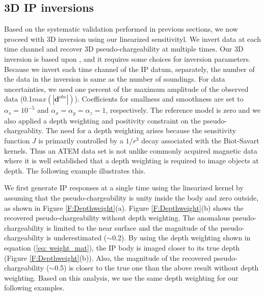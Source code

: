 \documentclass[a4paper, 11pt]{article}
\begin{document}
\subsection{3D IP inversions}
Based on the systematic validation performed in previous sections, we now proceed with 3D  inversion using our linearized sensitivityl.
We invert data at each  time channel and recover 3D pseudo-chargeability at multiple times. 
Our 3D inversion is based upon \cite{doug1994,Li2000}, and it requires some choices for inversion parameters. 
Because we invert each time channel of the IP datum, separately, the number of the data in the inversion is same as the number of soundings. 
For data uncertainties, we used one percent of the maximum amplitude of the observed data (0.1$max(|\mathbf{d}^{obs}|)$). Coefficients for smallness and smoothness are set to $\alpha_s=10^{-5}$ and $\alpha_x=\alpha_y=\alpha_z=1$, respectively. The reference model is zero and we also applied a depth weighting and positivity constraint on the pseudo-chargeablity. The need for a depth weighting arises because the sensitivity function $J$ is primarily controlled by a $1/r^3$ decay associated with the Biot-Savart kernels.  Thus an ATEM data set is not unlike commonly acquired  magnetic data where it is well established that a depth weighting is required to image objects at depth.  The following example illustrates this.  

We first generate IP responses at a single time using the linearized kernel by assuming that the pseudo-chargeability is unity inside the body and zero outside, as shown in  Figure \ref{F:Depthweight}(a). 
Figure \ref{F:Depthweight}(b) shows the recovered pseudo-chargeability without depth weighting. 
The anomalous pseudo-chargeability is limited to the near surface and the magnitude of the pseudo-chargeability is underestimated ($\sim$0.2). 
By using the depth weighting shown in equation (\ref{eq: weight_mat}),  the IP body is imaged closer to its true depth (Figure \ref{F:Depthweight}(b)). 
Also, the magnitude of the recovered pseudo-chargeability ($\sim$0.5) is closer to the true one than the above result without depth weighting. 
Based on this analysis, we use the same depth weighting for our  following examples. 
\end{document}
